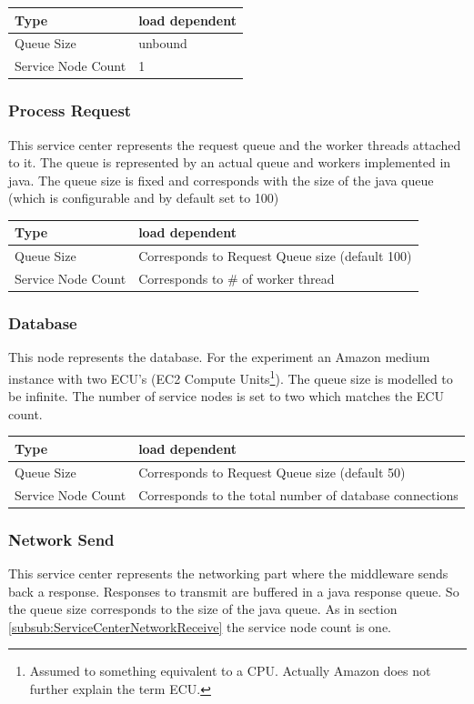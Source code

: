 \documentclass[a4paper]{article}
\begin{document}
\begin{tabular}{|l|l|}
\hline 
Type & load dependent \\ 
\hline 
Queue Size & unbound\\ 
\hline 
Service Node Count & 1 \\ 
\hline 
\end{tabular} 

\subsubsection{Process Request}
This service center represents the request queue and the worker threads attached to it. The queue is represented by an actual queue and workers implemented in java. The queue size is fixed and corresponds with the size of the java queue (which is configurable and by default set to 100) \\

\begin{tabular}{|l|l|}
\hline 
Type & load dependent \\ 
\hline 
Queue Size & Corresponds to Request Queue size (default 100)\\ 
\hline 
Service Node Count & Corresponds to \# of worker thread \\ 
\hline 
\end{tabular} 

\subsubsection{Database}
This node represents the database. For the experiment an Amazon medium instance with two ECU's (EC2 Compute Units\footnote{Assumed to something equivalent to a CPU. Actually Amazon does not further explain the term ECU.}). The queue size is modelled to be infinite. The number of service nodes is set to two which matches the ECU count.


\begin{tabular}{|l|l|}
\hline 
Type & load dependent \\ 
\hline 
Queue Size & Corresponds to Request Queue size (default 50)\\ 
\hline 
Service Node Count & Corresponds to the total number of database connections \\ 
\hline 
\end{tabular} 


\subsubsection{Network Send}
This service center represents the networking part where the middleware sends back a response. Responses to transmit are buffered in a java response queue. So the queue size corresponds to the size of the java queue. As in section  \ref{subsub:ServiceCenterNetworkReceive} the service node count is one. \\
\end{document}

